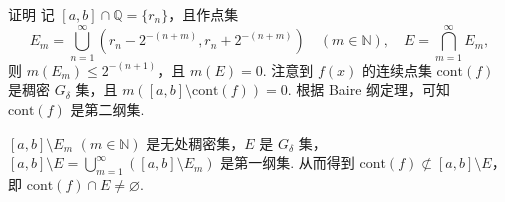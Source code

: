 \documentclass[../../main.tex]{subfiles}
\begin{document}
\begin{remark}
证明 记 \( [a, b] \cap \mathbb{Q} = \{ r_n \} \)，且作点集
\[
E_m = \bigcup_{n = 1}^{\infty} \left( r_n - 2^{-(n + m)}, r_n + 2^{-(n + m)} \right) \quad (m \in \mathbb{N}), \quad E = \bigcap_{m = 1}^{\infty} E_m,
\]
则 \( m(E_m) \leqslant  2^{-(n + 1)} \)，且 \( m(E) = 0 \). 注意到 \( f(x) \) 的连续点集 \( \mathrm{cont}(f) \) 是稠密 \( G_{\delta} \) 集，且 \( m([a, b] \setminus \mathrm{cont}(f)) = 0 \). 根据 Baire 纲定理，可知 \( \mathrm{cont}(f) \) 是第二纲集.

\( [a, b] \setminus E_m \) \( (m \in \mathbb{N}) \) 是无处稠密集，\( E \) 是 \( G_{\delta} \) 集，\( [a, b] \setminus E = \bigcup_{m = 1}^{\infty} ([a, b] \setminus E_m) \) 是第一纲集. 从而得到 \( \mathrm{cont}(f) \not\subset [a, b] \setminus E \)，即 \( \mathrm{cont}(f) \cap E \neq \varnothing \).
\end{remark}
\end{document}
